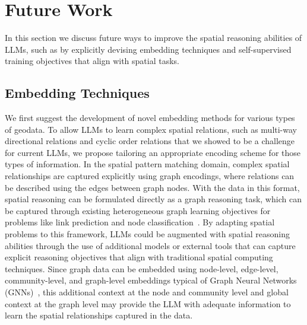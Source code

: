 \section{Future Work}
\label{section:future}

In this section we discuss future ways to improve the spatial reasoning abilities of LLMs, such as by explicitly devising embedding techniques and self-supervised training objectives that align with spatial tasks.

\subsection{Embedding Techniques}
We first suggest the development of novel embedding methods for various types of geodata.
To allow LLMs to learn complex spatial relations, such as multi-way directional relations and cyclic order relations that we showed to be a challenge for current LLMs, we propose tailoring an appropriate encoding scheme for those types of information.
In the spatial pattern matching domain, complex spatial relationships are captured explicitly using graph encodings, where relations can be described using the edges between graph nodes.
With the data in this format, spatial reasoning can be formulated directly as a graph reasoning task, which can be captured through existing heterogeneous graph learning objectives for problems like link prediction and node classification~\cite{Schneider2024}.
By adapting spatial problems to this framework, LLMs could be augmented with spatial reasoning abilities through the use of additional models or external tools that can capture explicit reasoning objectives that align with traditional spatial computing techniques.
Since graph data can be embedded using node-level, edge-level, community-level, and graph-level embeddings typical of Graph Neural Networks (GNNs)~\cite{Bai2019,Krlevza2016,Liu2020Neural}, this additional context at the node and community level and global context at the graph level may provide the LLM with adequate information to learn the spatial relationships captured in the data.



